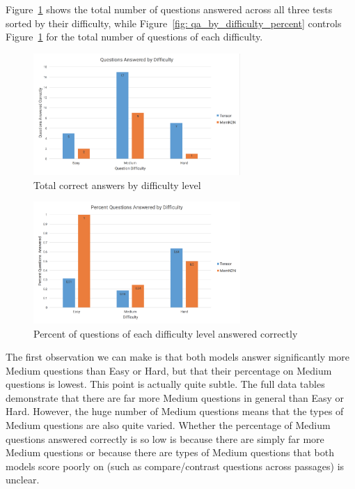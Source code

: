 \documentclass[pageno]{final_paper}
\begin{document}
Figure~\ref{fig: qa_by_difficulty} shows the total number of questions answered
across all three tests sorted by their difficulty, while Figure~\ref{fig:
qa_by_difficulty_percent} controls Figure~\ref{fig: qa_by_difficulty} for the
total number of questions of each difficulty.

\begin{figure}[!tb]
    \centering
    \includegraphics[width=0.7\textwidth,keepaspectratio]{figures/qa_by_difficulty.png}
    \caption{Total correct answers by difficulty level}
    \label{fig: qa_by_difficulty}
\end{figure}

\begin{figure}[!tb]
    \centering
    \includegraphics[width=0.7\textwidth,keepaspectratio]{figures/qa_by_difficulty_percent.png}
    \caption{Percent of questions of each difficulty level answered correctly}
    \label{fig: qa_by_difficulty_percent}
\end{figure}

The first observation we can make is that both models answer significantly more
Medium questions than Easy or Hard, but that their percentage on Medium
questions is lowest. This point is actually quite subtle. The full data tables
demonstrate that there are far more Medium questions in general than Easy or
Hard. However, the huge number of Medium questions means that the types of
Medium questions are also quite varied. Whether the percentage of Medium
questions answered correctly is so low is because there are simply far more
Medium questions or because there are types of Medium questions that both models
score poorly on (such as compare/contrast questions across passages) is unclear.
\end{document}
